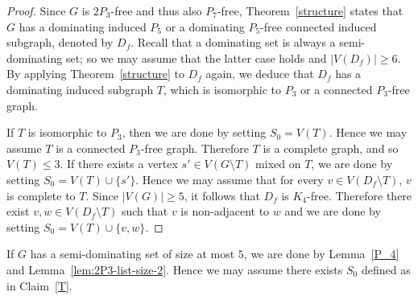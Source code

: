 \documentclass[11pt]{article}
\begin{document}
\begin{proof}
	Since $G$ is $2P_3$-free and thus also $P_7$-free, Theorem~\ref{structure} states that $G$ has a dominating induced $P_5$ or a dominating $P_5$-free connected induced subgraph, denoted by $D_f$. Recall that a dominating set is always a semi-dominating set; so we may assume that the latter case holds and $|V(D_f)|\geq 6$. By applying Theorem~\ref{structure} to $D_f$ again, we deduce that $D_f$ has a dominating induced subgraph $T$, which is isomorphic to $P_3$ or a connected $P_3$-free graph. 
	
	If $T$ is isomorphic to $P_3$, then we are done by setting $S_0=V(T)$.
	Hence we may assume $T$ is a connected $P_3$-free graph. Therefore $T$ is a complete graph, and so  $V(T)\leq 3$.  If there exists a vertex $s'\in V(G\setminus T)$ mixed on $T$, we are done by setting $S_0=V(T)\cup \{s'\}$. Hence we may assume that for every $v\in V(D_f\setminus T)$, $v$ is complete to $T$. Since $|V(G)|\geq 5$, it follows that $D_f$ is $K_4$-free. Therefore there exist $v,w\in V(D_f\setminus T)$ such that $v$ is non-adjacent to $w$ and we are done by setting $S_0=V(T)\cup \{v,w\}$.
\end{proof}

If $G$ has a semi-dominating set of size at most $5$, we are done by Lemma~\ref{P_4} and Lemma~\ref{lem:2P3-list-size-2}. Hence we may assume there exists $S_0$ defined as in Claim~\ref{T}. 



	
\end{document}
